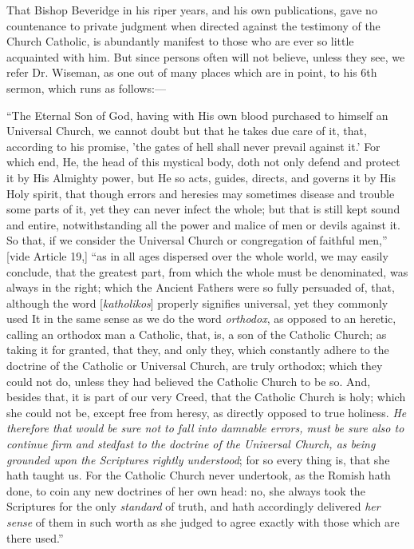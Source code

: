 That Bishop
Beveridge in his riper years, and his own publications, gave no
countenance to private judgment when directed against the testimony of
the Church Catholic, is abundantly manifest to those who are ever so
little acquainted with him. But since persons often will not believe,
unless they see, we refer Dr. Wiseman, as one out of many places which
are in point, to his 6th sermon, which runs as follows:—

``The
Eternal Son of God, having with His own blood purchased to himself an
Universal Church, we cannot doubt but that he takes due care of it,
that, according to his promise, 'the gates of hell shall never prevail
against it.' For which end, He, the head of this mystical body, doth
not only defend and protect it by His Almighty power, but He so acts,
guides, directs, and governs it by His Holy spirit, that though errors
and heresies may sometimes disease and trouble some parts of it, yet
they can never infect the whole; but that is still kept sound and
entire, notwithstanding all the power and malice of men or devils
against it. So that, if we consider the Universal Church or congregation
of faithful men,'' [vide Article 19,] ``as in all ages dispersed over
the whole world, we may easily conclude, that the greatest part, from
which the whole must be denominated, was always in the right; which the
Ancient Fathers were so fully persuaded of, that, although the word [\emph{katholikos}]
properly signifies universal, yet they commonly used It in the same
sense as we do the word \emph{orthodox}, as opposed to an heretic,
calling an orthodox man a Catholic, that, is, a son of the Catholic
Church; as taking it for granted, that they, and only they, which
constantly adhere to the doctrine of the Catholic or Universal Church,
are truly orthodox; which they could not do, unless they had believed
the Catholic Church to be so. And, besides that, it is part of our very
Creed, that the Catholic Church is holy; which she could not be, except
free from heresy, as directly opposed to true holiness. \emph{He therefore
that would be sure not to fall into damnable errors, must be sure also
to continue firm and stedfast to the doctrine of the Universal Church,
as being grounded upon the Scriptures rightly understood}; for so
every thing is, that she hath taught us. For the Catholic Church never
undertook, as the Romish hath done, to coin any new doctrines of her own
head: no, she always took the Scriptures for the only \emph{standard} of
truth, and hath accordingly delivered \emph{her sense} of them in such
worth as she judged to agree exactly with those which are there used.''

